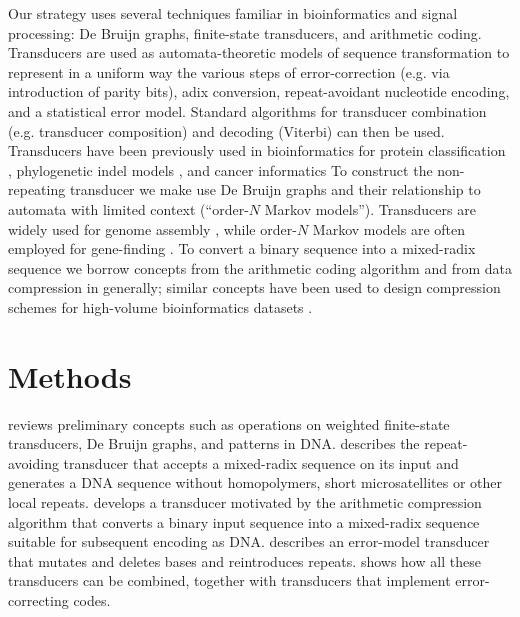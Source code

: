 \documentclass[english]{article}
\begin{document}
Our strategy uses several techniques familiar in bioinformatics and signal processing:
De Bruijn graphs, finite-state transducers, and arithmetic coding.
Transducers \cite{MohriPereiraRiley2000,WikipediaTransducers} are used as automata-theoretic models of sequence transformation
to represent in a uniform way the various steps of error-correction (e.g. via introduction of parity bits),
adix conversion, repeat-avoidant nucleotide encoding, and a statistical error model.
Standard algorithms for transducer combination (e.g. transducer composition)
and decoding (Viterbi) can then be used.
Transducers have been previously used in bioinformatics for
protein classification \cite{EskinEtAl2000},
phylogenetic indel models \cite{PatenEtAl2008,WestessonEtAlArxiv2012,WestessonEtAl2012},
and cancer informatics \cite{SchwarzEtAl2014}
To construct the non-repeating transducer
we make use De Bruijn graphs
and their relationship to automata with limited context (``order-$N$ Markov models'').
Transducers are widely used for genome assembly \cite{DeBruijn1946,PevznerEtAl2001,ZerbinoBirney2008,IqbalEtAl2012},
while order-$N$ Markov models are often employed for gene-finding \cite{BurgeKarlin1997,SalzbergEtAl1999}.
To convert a binary sequence into a mixed-radix sequence we borrow concepts from the arithmetic coding algorithm \cite{Rissanen1976,Mackay2003}
and from data compression in generally; similar concepts have been used to design compression schemes for high-volume
bioinformatics datasets \cite{HsiYangEtAl2011}.

\section{Methods}

 reviews preliminary concepts such as operations on weighted finite-state transducers,
De Bruijn graphs, and patterns in DNA.
 describes the repeat-avoiding transducer that accepts a mixed-radix sequence on its input
and generates a DNA sequence without homopolymers, short microsatellites or other local repeats.
 develops a transducer motivated by the arithmetic compression algorithm
that converts a binary input sequence into a mixed-radix sequence suitable for subsequent encoding as DNA.
 describes an error-model transducer that mutates and deletes bases and reintroduces repeats.
 shows how all these transducers can be combined, together with transducers that implement error-correcting codes.
\end{document}
